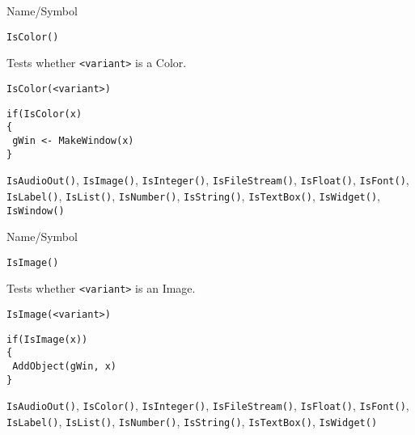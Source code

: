 \begin{desc}{Name/Symbol}
\item[Name/Symbol]	\verb+IsColor()+

\item[Description]	Tests whether \verb+<variant>+ is a Color.

\item[Usage]
\begin{verbatim}
IsColor(<variant>)
\end{verbatim}

\item[Example]
\begin{verbatim}
if(IsColor(x)
{
 gWin <- MakeWindow(x)
}
\end{verbatim}

\item[See Also] \verb+IsAudioOut()+, \verb+IsImage()+,
  \verb+IsInteger()+, \verb+IsFileStream()+, \verb+IsFloat()+,
  \verb+IsFont()+, \verb+IsLabel()+, \verb+IsList()+,
  \verb+IsNumber()+, \verb+IsString()+, \verb+IsTextBox()+,
  \verb+IsWidget()+, \verb+IsWindow()+
\end{desc}



\begin{desc}{Name/Symbol}
\item[Name/Symbol]	\verb+IsImage()+

\item[Description]	Tests whether \verb+<variant>+ is an Image.

\item[Usage]
\begin{verbatim}
IsImage(<variant>)
\end{verbatim}

\item[Example]	
\begin{verbatim}
if(IsImage(x))
{
 AddObject(gWin, x)
}
\end{verbatim}

\item[See Also] \verb+IsAudioOut()+, \verb+IsColor()+,
  \verb+IsInteger()+, \verb+IsFileStream()+, \verb+IsFloat()+,
  \verb+IsFont()+, \verb+IsLabel()+, \verb+IsList()+,
  \verb+IsNumber()+, \verb+IsString()+, \verb+IsTextBox()+,
  \verb+IsWidget()+
\end{desc}



